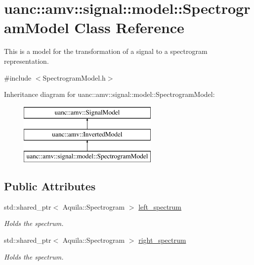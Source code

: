 \hypertarget{classuanc_1_1amv_1_1signal_1_1model_1_1_spectrogram_model}{}\section{uanc\+:\+:amv\+:\+:signal\+:\+:model\+:\+:Spectrogram\+Model Class Reference}
\label{classuanc_1_1amv_1_1signal_1_1model_1_1_spectrogram_model}


This is a model for the transformation of a signal to a spectrogram representation.  




{\ttfamily \#include $<$Spectrogram\+Model.\+h$>$}

Inheritance diagram for uanc\+:\+:amv\+:\+:signal\+:\+:model\+:\+:Spectrogram\+Model\+:\begin{figure}[H]
\begin{center}
\leavevmode
\includegraphics[height=3.000000cm]{classuanc_1_1amv_1_1signal_1_1model_1_1_spectrogram_model}
\end{center}
\end{figure}
\subsection*{Public Attributes}
\begin{DoxyCompactItemize}
\item 
std\+::shared\+\_\+ptr$<$ Aquila\+::\+Spectrogram $>$ \hyperlink{classuanc_1_1amv_1_1signal_1_1model_1_1_spectrogram_model_accb3ed97c155fdec9022bb2d5b106015}{left\+\_\+spectrum}
\begin{DoxyCompactList}\small\item\em Holds the spectrum. \end{DoxyCompactList}\item 
std\+::shared\+\_\+ptr$<$ Aquila\+::\+Spectrogram $>$ \hyperlink{classuanc_1_1amv_1_1signal_1_1model_1_1_spectrogram_model_a3a3559cdc08ae00f3617de962e606c4a}{right\+\_\+spectrum}
\begin{DoxyCompactList}\small\item\em Holds the spectrum. \end{DoxyCompactList}\end{DoxyCompactItemize}


